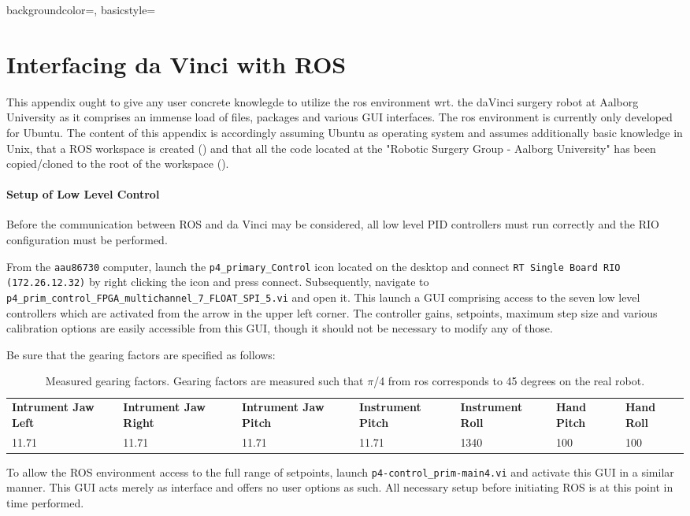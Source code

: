 {
    backgroundcolor=\color{black},
    basicstyle=\scriptsize\color{green}%
}
%
\chapter{Interfacing da Vinci with ROS}\label{app:ros}
This appendix ought to give any user concrete knowlegde to utilize the \gls{ros} environment wrt. the \gls{daVinci} surgery robot at Aalborg University as it comprises an immense load of files, packages and various GUI interfaces. The \gls{ros} environment is currently only developed for Ubuntu. The content of this appendix is accordingly assuming Ubuntu as operating system and assumes additionally basic knowledge in Unix, that a ROS workspace is created ({}) and that all the code located at the "Robotic Surgery Group - Aalborg University" has been copied/cloned to the root of the workspace ({}).
\subsubsection*{Setup of Low Level Control}
Before the communication between ROS and da Vinci may be considered, all low level PID controllers must run correctly and the RIO configuration must be performed. 

From the \texttt{aau86730} computer, launch the \texttt{p4\_primary\_Control} icon located on the desktop and connect \texttt{RT Single Board RIO (172.26.12.32)} by right clicking the icon and press connect. Subsequently, navigate to \texttt{p4\_prim\_control\_FPGA\_multichannel\_7\_FLOAT\_SPI\_5.vi} and open it. This launch a GUI comprising access to the seven low level controllers which are activated from the arrow in the upper left corner. The controller gains, setpoints, maximum step size and various calibration options are easily accessible from this GUI, though it should not be necessary to modify any of those. 

Be sure that the gearing factors are specified as follows:
\begin{table}[H]
\begin{tabularx}{\textwidth}{X X X X X X X}
\rowcolor{HeaderBlue} 
\scriptsize \textbf{Intrument Jaw Left} &\scriptsize  \textbf{Intrument Jaw Right} &\scriptsize  \textbf{Intrument Jaw Pitch} &\scriptsize  \textbf{Instrument Pitch} &\scriptsize  \textbf{Instrument Roll} & \scriptsize   \textbf{Hand Pitch} &  \scriptsize\textbf{Hand Roll}\\
11.71 & 11.71 & 11.71 & 11.71 & 1340 & 100 & 100\\
\end{tabularx}
	\caption{Measured gearing factors. Gearing factors are measured such that $\pi$/4 from \gls{ros} corresponds to 45 degrees on the real robot.}
\label{tab:gearing}
\end{table}
To allow the ROS environment access to the full range of setpoints, launch \texttt{p4-control\_prim-main4.vi} and activate this GUI in a similar manner. This GUI acts merely as interface and offers no user options as such. All necessary setup before initiating ROS is at this point in time performed.
